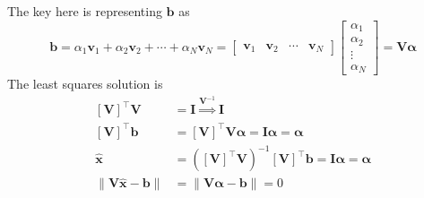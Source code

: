 \documentclass[]{article}
\newcommand{\unit}[1]{\bm{\hat{#1}}}
\newcommand{\tpose}[1]{\left[#1\right]^{\! \top} \!\!}
\begin{document}
The key here is representing \(\bm{b}\) as
\begin{equation}
	\bm{b} = \alpha_1 \bm{v}_1 + \alpha_2 \bm{v}_2 + \cdots + \alpha_N \bm{v}_N = \begin{bmatrix}
	\bm{v}_1 & \bm{v}_2 & \cdots & \bm{v}_N
	\end{bmatrix}
	\begin{bmatrix}
	\alpha_1 \\
	\alpha_2 \\
	\vdots \\
	\alpha_N
	\end{bmatrix} = \bm{V} \bm{\alpha}
\end{equation}
The least squares solution is
\begin{align}
	\tpose{\bm{V}} \bm{V} &= \bm{I} \overset{\bm{V}^{-1}}{\Rightarrow} \bm{I} \\
	\tpose{\bm{V}} \bm{b} &= \tpose{\bm{V}} \bm{V} \bm{\alpha} = \bm{I} \bm{\alpha} = \bm{\alpha} \\
	\unit{x} &= (\tpose{\bm{V}} \bm{V})^{-1} \tpose{\bm{V}} \bm{b} = \bm{I} \bm{\alpha} = \bm{\alpha} \\
	\|\bm{V}\unit{x} - \bm{b}\| &= \|\bm{V}\bm{\alpha} - \bm{b}\| = 0
\end{align}

\subsection{}
\end{document}
